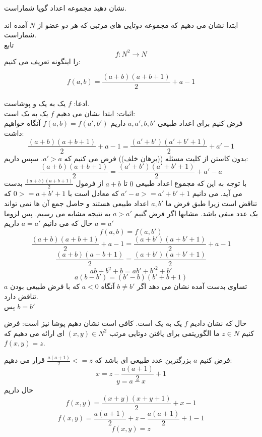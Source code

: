 نشان دهید مجموعه اعداد گویا شماراست.
\begin{ans}
    ابتدا نشان می دهیم که مجموعه دوتایی های مرتبی که هر دو عضو از 
    $N$
    آمده اند شماراست.
    \\
    تابع
    \[f:N^{2}\rightarrow N\]
    را اینگونه تعریف می کنیم:

    \[f(a,b) = \frac{(a+b)(a+b+1)}{2} + a - 1\]
    \\
    ادعا: 
    $f$
    یک به یک و پوشاست. 
    \\
    اثبات:
    ابتدا نشان می دهیم 
    $f$
    یک به یک است:
    \\
    فرض کنیم برای اعداد طبیعی
    $a,a',b,b'$
    داریم
    $f(a,b) = f(a',b')$
    آنگاه خواهیم داشت:
    \[\frac{(a+b)(a+b+1)}{2} + a - 1 = \frac{(a'+b')(a'+b'+1)}{2} + a' - 1\]
    بدون کاستن از کلیت  مسئله ((برهان خلف)) فرض می کنیم که 
    $a' > a$.
    سپس داریم:
    \[\frac{(a+b)(a+b+1)}{2} = \frac{(a'+b')(a'+b'+1)}{2} + a' - a\]
    با توجه به این که مجموع اعداد طبیعی 
    $0$
    تا
    $a+b$
    از فرمول 
    $\frac{(a+b)(a+b+1)}{2}$
    بدست می آید. می دانیم 
    $a'-a >= a'+b'+1$
    که معادل است با
    $0 >= a + b' + 1$
    که تناقض است زیرا طبق فرض ما 
    $a,b'$
    اعداد طبیعی هستند و حاصل جمع آن ها نمی تواند یک عدد منفی باشد. مشابها اگر فرض گنیم
    $a > a'$
    به نتیجه مشابه می رسیم. پس لزوما
    $a = a'$
    حال که می دانیم
    $a = a'$
    داریم
    \[f(a,b) = f(a,b')\]
    \[\frac{(a+b)(a+b+1)}{2} + a - 1 = \frac{(a+b')(a+b'+1)}{2} + a - 1\]
    \[\frac{(a+b)(a+b+1)}{2} = \frac{(a+b')(a+b'+1)}{2}\]
    \[ab + b^{2} + b = ab' + b'^{2} + b'\]
    \[a(b-b') = (b'-b)(b'+b+1)\]
    تساوی بدست آمده نشان می دهد اگر 
    $b \neq b'$
    آنگاه 
    $a < 0$
    که با فرض طبیعی بودن 
    $a$
    تناقض دارد.
    \\
    پس 
    $b = b'$

    حال که نشان دادیم 
    $f$
    یک به یک است. کافی است نشان دهیم پوشا نیز است:
    فرض کنیم 
    $z \in N$
    ما الگوریتمی برای یافتن دوتایی مرتب 
    $(x,y) \in N^{2}$
    ای ارائه می دهیم که 
    $f(x,y) = z$.

    فرض کنیم 
    $a$
    بزرگترین عدد طبیعی ای باشد که 
    $\frac{a(a+1)}{2} <= z$
    قرار می دهیم:
    \[x = z - \frac{a(a+1)}{2} + 1\]
    \[y = a - x\]
    حال داریم
    \[f(x,y) = \frac{(x+y)(x+y+1)}{2} + x - 1\]
    \[f(x,y) = \frac{a(a+1)}{2} + z - \frac{a(a+1)}{2} + 1 -1\]
    \[f(x,y) = z\]


\end{ans}
